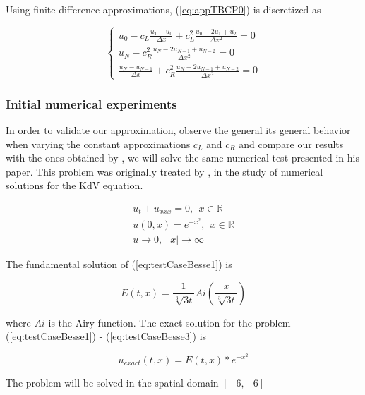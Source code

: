 \indent Using finite difference approximations, (\ref{eq:appTBCP0}) is discretized as

\begin{equation}
\label{eq:appDiscTBCP0}
    \begin{cases}
        u_0 - c_L \frac{u_1 - u_0}{\Delta x}  + c_L^2  \frac{u_0 -2u_1 + u_2}{\Delta x^2} = 0 \\
        u_N - c_R^2    \frac{u_N -2u_{N-1} + u_{N-2}}{\Delta x^2} = 0 \\
        \frac{u_N - u_{N-1}}{\Delta x}  + c_R^2    \frac{u_N -2u_{N-1} + u_{N-2}}{\Delta x^2} = 0 
    \end{cases}
\end{equation}

\subsubsection{Initial numerical experiments}

\indent In order to validate our approximation, observe the general its general behavior when varying the constant approximations $c_L$ and $c_R$ and compare our results with the ones obtained by \cite{besse2015}, we will solve the same numerical test presented in his paper. This problem was originally treated by \cite{zheng2008}, in the study of numerical solutions for the KdV equation.

\begin{gather}
\label{eq:testCaseBesse1}
 u_t + u_{xxx} = 0, \ \ x \in \mathbb{R} \\
 \label{eq:testCaseBesse2}
 u(0,x) = e^{-x^2}, \ \ x \in \mathbb{R}  \\
 \label{eq:testCaseBesse3}
 u \rightarrow 0, \ \ |x| \rightarrow \infty
\end{gather}

\indent The fundamental solution of (\ref{eq:testCaseBesse1}) is

\begin{equation}
    E(t,x) = \frac{1}{\sqrt[3]{3t}}Ai\left(\frac{x}{\sqrt[3]{3t}} \right)
\end{equation}

\noindent where $Ai$ is the Airy function. The exact solution for the problem (\ref{eq:testCaseBesse1}) - (\ref{eq:testCaseBesse3}) is

\begin{equation}
    u_{exact}(t,x) = E(t,x) * e^{-x^2}
\end{equation}

\indent The problem will be solved in the spatial domain $[-6,-6]$


